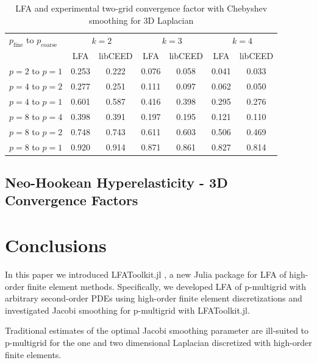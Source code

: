 \documentclass[review]{siamart190516}
\begin{document}
\begin{table}[ht!]
\begin{center}
\begin{tabular}{l cc cc cc}
  \toprule
  $p_{\text{fine}}$ to $p_{\text{coarse}}$  &  \multicolumn{2}{c}{$k = 2$}  &  \multicolumn{2}{c}{$k = 3$}  &  \multicolumn{2}{c}{$k = 4$}  \\
                      &  LFA  &  libCEED  &  LFA  &  libCEED  &  LFA  &  libCEED  \\
  \toprule
  $p = 2$ to $p = 1$  &  0.253 & 0.222  &  0.076 & 0.058  &  0.041 & 0.033  \\
  \midrule
  $p = 4$ to $p = 2$  &  0.277 & 0.251  &  0.111 & 0.097  &  0.062 & 0.050  \\
  $p = 4$ to $p = 1$  &  0.601 & 0.587  &  0.416 & 0.398  &  0.295 & 0.276  \\
  \midrule
  $p = 8$ to $p = 4$  &  0.398 & 0.391  &  0.197 & 0.195  &  0.121 & 0.110  \\
  $p = 8$ to $p = 2$  &  0.748 & 0.743  &  0.611 & 0.603  &  0.506 & 0.469  \\
  $p = 8$ to $p = 1$  &  0.920 & 0.914  &  0.871 & 0.861  &  0.827 & 0.814  \\
  \bottomrule
\end{tabular}
\end{center}
\caption{LFA and experimental two-grid convergence factor with Chebyshev smoothing for 3D Laplacian}
\label{table:two_grid_3d_chebyshev}
\end{table}

\subsection{Neo-Hookean Hyperelasticity - 3D Convergence Factors}\label{sec:solidsresults}

\section{Conclusions}\label{sec:conclusion}

In this paper we introduced LFAToolkit.jl \cite{thompson2021toolkit}, a new Julia package for LFA of high-order finite element methods.
Specifically, we developed LFA of p-multigrid with arbitrary second-order PDEs using high-order finite element discretizations and investigated Jacobi smoothing for p-multigrid with LFAToolkit.jl.

Traditional estimates of the optimal Jacobi smoothing parameter are ill-suited to p-multigrid for the one and two dimensional Laplacian discretized with high-order finite elements.



\end{document}

